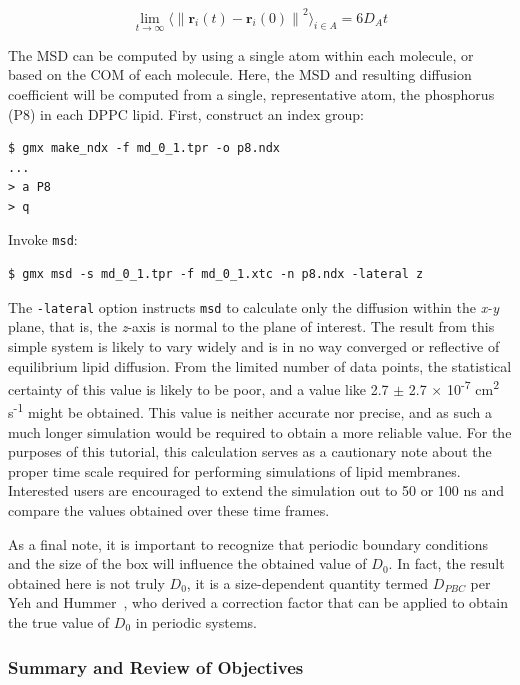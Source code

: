 \documentclass[9pt,tutorial,pubversion]{livecoms}
\newcommand{\norm}[1]{\left\lVert#1\right\rVert}
\begin{document}
\begin{equation} \label{eq_msd}
\lim_{t\to\infty} \langle \norm{\mathbf{r}_i(t) - \mathbf{r}_i(0)}^2 \rangle_{i \in A} = 6D_{A}t
\end{equation}

The MSD can be computed by using a single atom within each molecule, or based on the COM of each molecule. Here, the MSD and resulting diffusion coefficient will be computed from a single, representative atom, the phosphorus (P8) in each DPPC lipid. First, construct an index group:

\begin{lstlisting}
$ gmx make_ndx -f md_0_1.tpr -o p8.ndx
...
> a P8
> q
\end{lstlisting}

Invoke \texttt{msd}:

\begin{lstlisting}
$ gmx msd -s md_0_1.tpr -f md_0_1.xtc -n p8.ndx -lateral z
\end{lstlisting}
%
The \texttt{-lateral} option instructs \texttt{msd} to calculate only the diffusion within the {\em x-y} plane, that is, the {\em z}-axis is normal to the plane of interest. The result from this simple system is likely to vary widely and is in no way converged or reflective of equilibrium lipid diffusion. From the limited number of data points, the statistical certainty of this value is likely to be poor, and a value like 2.7 $\pm$ 2.7 $\times$ 10\textsuperscript{-7} cm\textsuperscript{2} s\textsuperscript{-1} might be obtained. This value is neither accurate nor precise, and as such a much longer simulation would be required to obtain a more reliable value. For the purposes of this tutorial, this calculation serves as a cautionary note about the proper time scale required for performing simulations of lipid membranes. Interested users are encouraged to extend the simulation out to 50 or 100 ns and compare the values obtained over these time frames.

As a final note, it is important to recognize that periodic boundary conditions and the size of the box will influence the obtained value of $D_0$. In fact, the result obtained here is not truly $D_0$, it is a size-dependent quantity termed $D_{PBC}$ per Yeh and Hummer~\cite{Yeh2004}, who derived a correction factor that can be applied to obtain the true value of $D_0$ in periodic systems.

\subsubsection{Summary and Review of Objectives} \label{kalp_summary}
\end{document}
